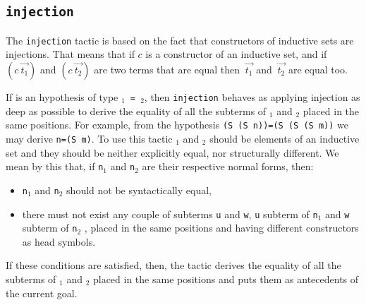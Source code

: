 
\subsection{\tt injection {\ident}}
\label{injection}
The {\tt injection} tactic is based on the fact that constructors of
inductive sets are injections. That means that if $c$ is a constructor
of an inductive set, and if $(c~\vec{t_1})$ and $(c~\vec{t_2})$ are two
terms that are equal then $~\vec{t_1}$ and $~\vec{t_2}$ are equal
too.

If {\ident} is an hypothesis of type {\tt {\term$_1$} = {\term$_2$}},
then {\tt injection} behaves as applying injection as deep as possible to
derive the equality of all the subterms of {\term$_1$} and {\term$_2$}
placed in the same positions. For example, from the hypothesis {\tt (S
  (S n))=(S (S (S m))} we may derive {\tt n=(S m)}.  To use this
tactic {\term$_1$} and {\term$_2$} should be elements of an inductive
set and they should be neither explicitly equal, nor structurally
different. We mean by this that, if {\tt n$_1$} and {\tt n$_2$} are
their respective normal forms, then:
\begin{itemize}
\item {\tt n$_1$} and {\tt n$_2$} should not be syntactically equal,
\item there must not exist any couple of subterms {\tt u} and {\tt w},
  {\tt u} subterm of {\tt n$_1$} and {\tt w} subterm of {\tt n$_2$} ,
  placed in the same positions and having different constructors as
  head symbols.
\end{itemize}
If these conditions are satisfied, then, the tactic derives the
equality of all the subterms of {\term$_1$} and {\term$_2$} placed in
the same positions and puts them as antecedents of the current goal.

